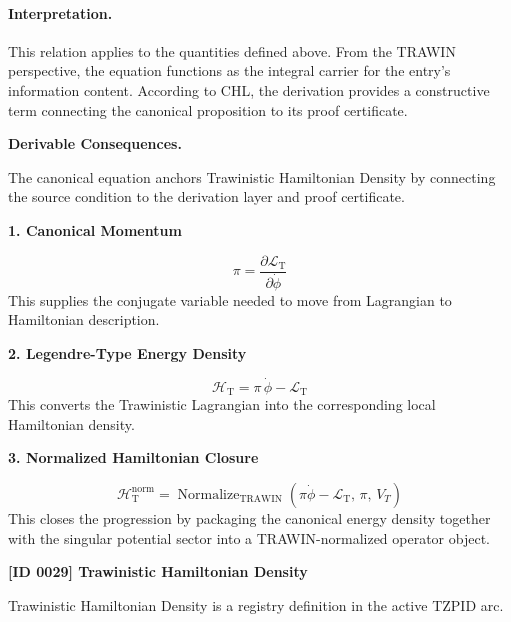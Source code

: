 \paragraph{Interpretation.}
This relation applies to the quantities defined above. From the TRAWIN perspective, the equation functions as the integral carrier for the entry’s information content. According to CHL, the derivation provides a constructive term connecting the canonical proposition to its proof certificate.

\par\vspace{0.35em}
\noindent\textbf{Derivable Consequences.}\quad
\begingroup
\footnotesize
\raggedright
The canonical equation anchors Trawinistic Hamiltonian Density by connecting the source condition to the derivation layer and proof certificate.
\par\endgroup

\noindent\textbf{1. Canonical Momentum}\par
\[
\pi
=
\frac{\partial \mathcal{L}_{\mathrm{T}}}{\partial \dot{\phi}}
\]
\noindent This supplies the conjugate variable needed to move from Lagrangian to Hamiltonian description.\par
\noindent\textbf{2. Legendre-Type Energy Density}\par
\[
\mathcal{H}_{\mathrm{T}}
=
\pi\,\dot{\phi}
-\mathcal{L}_{\mathrm{T}}
\]
\noindent This converts the Trawinistic Lagrangian into the corresponding local Hamiltonian density.\par
\noindent\textbf{3. Normalized Hamiltonian Closure}\par
\[
\mathcal{H}_{\mathrm{T}}^{\mathrm{norm}}
=
\operatorname{Normalize}_{\mathrm{TRAWIN}}
\!\left(
\pi\dot{\phi}-\mathcal{L}_{\mathrm{T}},\,
\pi,\,
V_{T}
\right)
\]
\noindent This closes the progression by packaging the canonical energy density together with the singular potential sector into a TRAWIN-normalized operator object.\par

\clearpage
\noindent\textbf{[ID 0029] Trawinistic Hamiltonian Density}\par
\vspace{0.35em}
\begingroup\small
{}
Trawinistic Hamiltonian Density is a registry definition in the active TZPID arc.

